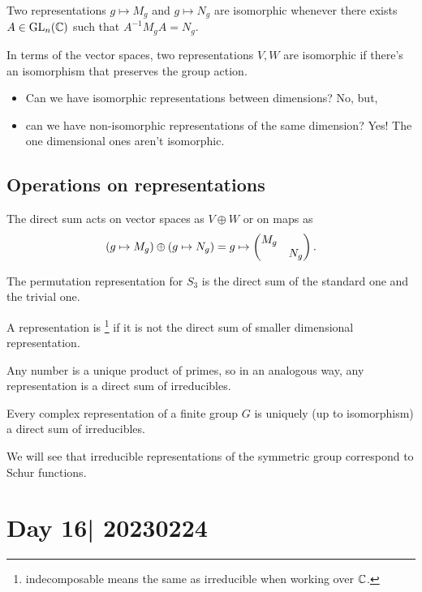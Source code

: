 \documentclass[12pt]{memoir}
\begin{document}
\begin{Def}
Two representations $g\mapsto M_g$ and $g\mapsto N_g$ are isomorphic whenever there exists $A\in\operatorname{GL}_n(\mathbb{C})$ such that $A^{-1}M_gA=N_g$.\par 
In terms of the vector spaces, two representations $V,W$ are isomorphic if there's an isomorphism that preserves the group action. 
\end{Def}

\begin{itemize}
    \itemsep=-0.4em
    \item Can we have isomorphic representations between dimensions? No, but,
    \item can we have non-isomorphic representations of the same dimension? Yes! The one dimensional ones aren't isomorphic.
\end{itemize}
\subsection{Operations on representations}

The direct sum acts on vector spaces as $V\oplus W$ or on maps as 
$$(g\mapsto M_g)\oplus(g\mapsto N_g)=g\mapsto\begin{pmatrix} M_g &  \\  & N_g \end{pmatrix}.$$

\begin{Ex}
    The permutation representation for $S_3$ is the direct sum of the standard one and the trivial one.
\end{Ex}

\begin{Def}
    A representation is \footnote{indecomposable means the same as irreducible when working over $\mathbb{C}$.} if it is not the direct sum of smaller dimensional representation.
\end{Def}
Any number is a unique product of primes, so in an analogous way, any representation is a direct sum of irreducibles.

\begin{Th}
    Every complex representation of a finite group $G$ is uniquely (up to isomorphism) a direct sum of irreducibles.
\end{Th}

We will see that irreducible representations of the symmetric group correspond to Schur functions. 

\section{Day 16| 20230224}
\end{document}
